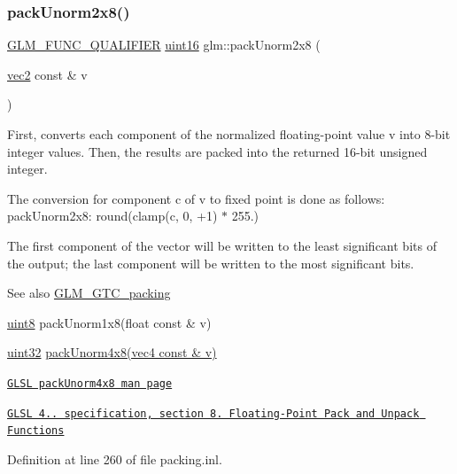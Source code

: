 \subsubsection{\texorpdfstring{pack\+Unorm2x8()}{packUnorm2x8()}}
{\footnotesize\ttfamily \hyperlink{setup_8hpp_a33fdea6f91c5f834105f7415e2a64407}{G\+L\+M\+\_\+\+F\+U\+N\+C\+\_\+\+Q\+U\+A\+L\+I\+F\+I\+ER} \hyperlink{group__gtc__type__precision_gad8c2939e1fdd8e5828b31d95c52255d5}{uint16} glm\+::pack\+Unorm2x8 (\begin{DoxyParamCaption}\item[{\hyperlink{group__core__types_gaa1618f51db67eaa145db101d8c8431d8}{vec2} const \&}]{v }\end{DoxyParamCaption})}

First, converts each component of the normalized floating-\/point value v into 8-\/bit integer values. Then, the results are packed into the returned 16-\/bit unsigned integer.

The conversion for component c of v to fixed point is done as follows\+: pack\+Unorm2x8\+: round(clamp(c, 0, +1) $\ast$ 255.)

The first component of the vector will be written to the least significant bits of the output; the last component will be written to the most significant bits.

\begin{DoxySeeAlso}{See also}
\hyperlink{group__gtc__packing}{G\+L\+M\+\_\+\+G\+T\+C\+\_\+packing} 

\hyperlink{group__gtc__type__precision_ga1a7dcd8aac97cc8020817c94049deff2}{uint8} pack\+Unorm1x8(float const \& v) 

\hyperlink{group__gtc__type__precision_ga202b6a53c105fcb7e531f9b443518451}{uint32} \hyperlink{group__core__func__packing_ga834ee9a9e73dcb0a7c1fc88143f3edb8}{pack\+Unorm4x8(vec4 const \& v)} 

\href{http://www.opengl.org/sdk/docs/manglsl/xhtml/packUnorm4x8.xml}{\tt G\+L\+SL pack\+Unorm4x8 man page} 

\href{http://www.opengl.org/registry/doc/GLSLangSpec.4.20.8.pdf}{\tt G\+L\+SL 4.. specification, section 8. Floating-\/\+Point Pack and Unpack Functions} 
\end{DoxySeeAlso}


Definition at line 260 of file packing.\+inl.

\mbox{\label{group__gtc__packing_ga2cf2d11b40bd48639110456fd74c2e33}} 
